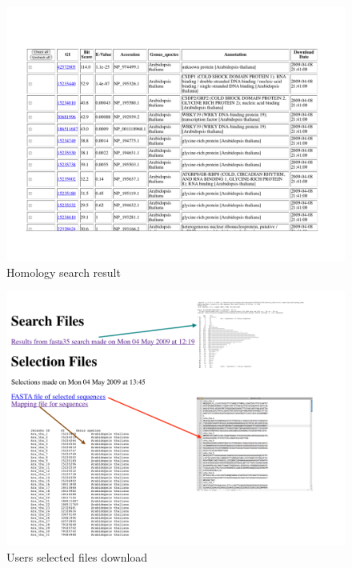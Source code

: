 \documentclass[11pt,letterpaper,twoside,english]{article}
\begin{document}
%
\begin{figure}[h]
\begin{centering}
\includegraphics[width=1\linewidth]{figures/Result_selection}
\par\end{centering}

\caption{\label{fig:Homology-search-result}Homology search result}

\end{figure}


%
\begin{figure}[h]
\begin{centering}
\includegraphics[width=0.8\linewidth]{figures/User_selection}
\par\end{centering}

\caption{\label{fig:Users-selected-files}Users selected files download}

\end{figure}
\end{document}
